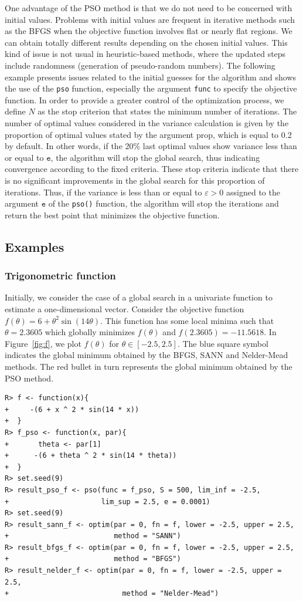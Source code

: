\documentclass[10pt,letterpaper]{article}
\begin{document}
One advantage of the PSO method is that we do not need to be concerned with initial values. Problems with initial values are frequent
in iterative methods such as the BFGS when the objective function involves flat or nearly flat regions. We can obtain totally different
results depending on the chosen initial values. This kind of issue is not usual in heuristic-based methods, where the updated steps include
randomness (generation of pseudo-random numbers). The following example presents issues related to the initial guesses for the algorithm
and shows the use of the {\tt pso} function, especially the argument {\tt func} to specify the objective function.
In order to provide a greater control of the optimization process, we define $N$ as the stop criterion that states the minimum number of iterations.
The number of optimal values considered in the variance calculation is given by the proportion of optimal values stated by the argument prop,
which is equal to 0.2 by default. In other words, if the 20\% last optimal values show variance less than or equal to $\texttt{e}$, the algorithm will stop
the global search, thus indicating convergence according to the fixed criteria. These stop criteria indicate that there is no significant improvements
in the global search for this proportion of iterations. Thus, if the variance is less than or equal to $\varepsilon > 0$ assigned to the
argument $\texttt{e}$ of the \texttt{pso()} function, the algorithm will stop the iterations and return the best point that minimizes the objective
function.

\subsection{Examples}
\subsubsection{Trigonometric function}
Initially, we consider the case of a global search in a univariate function to estimate a one-dimensional vector.
Consider the objective function $f(\theta) = 6 + \theta^2 \sin(14\theta)$. This function has some local minima
such that $\theta= 2.3605$ which globally minimizes $f(\theta)$ and $f(2.3605) = -11.5618$. In Figure~\ref{fig:f},
we plot $f(\theta)$ for $\theta \in [-2.5, 2.5]$. The blue square symbol indicates the global minimum obtained by the
BFGS, SANN and Nelder-Mead methods. The red bullet in turn represents the global minimum obtained by the PSO method.

\begin{verbatim}
R> f <- function(x){
+     -(6 + x ^ 2 * sin(14 * x))
+  }
R> f_pso <- function(x, par){
+	    theta <- par[1]
+ 	   -(6 + theta ^ 2 * sin(14 * theta))
+  }
R> set.seed(9)
R> result_pso_f <- pso(func = f_pso, S = 500, lim_inf = -2.5,
+                      lim_sup = 2.5, e = 0.0001)
R> set.seed(9)
R> result_sann_f <- optim(par = 0, fn = f, lower = -2.5, upper = 2.5,
+                         method = "SANN")
R> result_bfgs_f <- optim(par = 0, fn = f, lower = -2.5, upper = 2.5,
+                         method = "BFGS")
R> result_nelder_f <- optim(par = 0, fn = f, lower = -2.5, upper = 2.5,
+                           method = "Nelder-Mead")
\end{verbatim}
\end{document}
